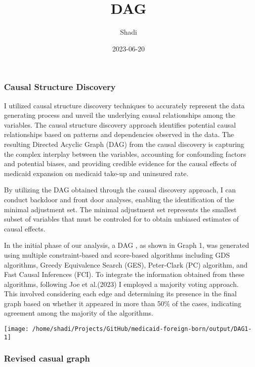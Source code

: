 \documentclass[
]{article}
\title{DAG}
\author{Shadi}
\date{2023-06-20}
\begin{document}
\maketitle

\hypertarget{causal-structure-discovery}{%
\subsubsection{Causal Structure
Discovery}\label{causal-structure-discovery}}

I utilized causal structure discovery techniques to accurately represent
the data generating process and unveil the underlying causal
relationships among the variables. The causal structure discovery
approach identifies potential causal relationships based on patterns and
dependencies observed in the data. The resulting Directed Acyclic Graph
(DAG) from the causal discovery is capturing the complex interplay
between the variables, accounting for confounding factors and potential
biases, and providing credible evidence for the causal effects of
medicaid expansion on medicaid take-up and uninsured rate.

By utilizing the DAG obtained through the causal discovery approach, I
can conduct backdoor and front door analyses, enabling the
identification of the minimal adjustment set. The minimal adjustment set
represents the smallest subset of variables that must be controled for
to obtain unbiased estimates of causal effects.

In the initial phase of our analysis, a DAG , as shown in Graph 1, was
generated using multiple constraint-based and score-based algorithms
including GDS algorithms, Greedy Equivalence Search (GES), Peter-Clark
(PC) algorithm, and Fast Causal Inferences (FCI). To integrate the
information obtained from these algorithms, following Joe et al.(2023) I
employed a majority voting approach. This involved considering each edge
and determining its presence in the final graph based on whether it
appeared in more than 50\% of the cases, indicating agreement among the
majority of the algorithms.

\begin{center}\texttt{[image: /home/shadi/Projects/GitHub/medicaid-foreign-born/output/DAG1-1]} \end{center}

\hypertarget{revised-casual-graph}{%
\subsubsection{Revised casual graph}\label{revised-casual-graph}}
\end{document}
